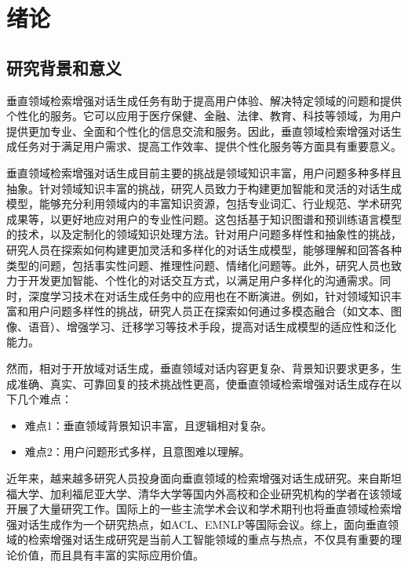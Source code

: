 \chapter{绪论}
%
\section{研究背景和意义}
%
垂直领域检索增强对话生成任务有助于提高用户体验、解决特定领域的问题和提供个性化的服务。它可以应用于医疗保健、金融、法律、教育、科技等领域，为用户提供更加专业、全面和个性化的信息交流和服务。因此，垂直领域检索增强对话生成任务对于满足用户需求、提高工作效率、提供个性化服务等方面具有重要意义。

垂直领域检索增强对话生成目前主要的挑战是领域知识丰富，用户问题多种多样且抽象。针对领域知识丰富的挑战，研究人员致力于构建更加智能和灵活的对话生成模型，能够充分利用领域内的丰富知识资源，包括专业词汇、行业规范、学术研究成果等，以更好地应对用户的专业性问题。这包括基于知识图谱和预训练语言模型的技术，以及定制化的领域知识处理方法。针对用户问题多样性和抽象性的挑战，研究人员在探索如何构建更加灵活和多样化的对话生成模型，能够理解和回答各种类型的问题，包括事实性问题、推理性问题、情绪化问题\cite{JSJX202312001}等。此外，研究人员也致力于开发更加智能、个性化的对话交互方式，以满足用户多样化的沟通需求。同时，深度学习技术在对话生成任务中的应用也在不断演进。例如，针对领域知识丰富和用户问题多样性的挑战，研究人员正在探索如何通过多模态融合（如文本、图像、语音）、增强学习、迁移学习等技术手段，提高对话生成模型的适应性和泛化能力。

然而，相对于开放域对话生成，垂直领域对话内容更复杂、背景知识要求更多，生成准确、真实、可靠回复的技术挑战性更高，使垂直领域检索增强对话生成存在以下几个难点：

\begin{itemize}[topsep = 0 pt, itemsep= 0 pt, parsep=0pt, partopsep=0pt, leftmargin=36pt, itemindent=0pt, labelsep=6pt, listparindent=24pt]
	\item 难点1：垂直领域背景知识丰富，且逻辑相对复杂。
	\item 难点2：用户问题形式多样，且意图难以理解。
\end{itemize}

近年来，越来越多研究人员投身面向垂直领域的检索增强对话生成研究\cite{RJXB202402009}。来自斯坦福大学、加利福尼亚大学、清华大学等国内外高校和企业研究机构的学者在该领域开展了大量研究工作。国际上的一些主流学术会议和学术期刊也将垂直领域检索增强对话生成作为一个研究热点，如ACL、EMNLP等国际会议。综上，面向垂直领域的检索增强对话生成研究是当前人工智能领域的重点与热点，不仅具有重要的理论价值，而且具有丰富的实际应用价值。

